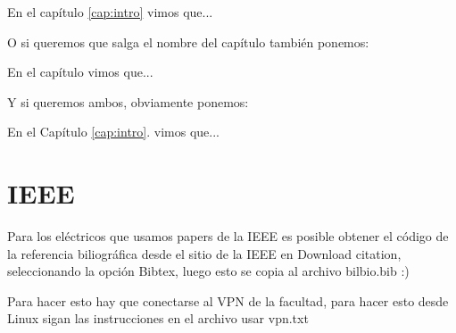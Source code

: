 En el capítulo \ref{cap:intro} vimos que...

O si queremos que salga el nombre del capítulo también ponemos: 

En el capítulo  vimos que...

Y si queremos ambos, obviamente ponemos:

En el Capítulo \ref{cap:intro}.  vimos que...

\section{IEEE}\label{cap:antecedentes:ieee}
Para los eléctricos que usamos papers de la IEEE es posible obtener el código de la referencia biliográfica desde el sitio de la IEEE en Download citation, seleccionando la opción Bibtex, luego esto se copia al archivo bilbio.bib :)

Para hacer esto hay que conectarse al VPN de la facultad, para hacer esto desde Linux sigan las instrucciones en el archivo usar vpn.txt
